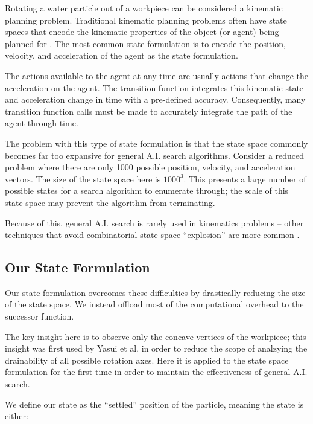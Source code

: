 Rotating a water particle out of a workpiece can be considered a kinematic planning problem. Traditional kinematic planning problems often have state spaces that encode the kinematic properties of the object (or agent) being planned for \cite{kuffner2000rrt}. The most common state formulation is to encode the position, velocity, and acceleration of the agent as the state formulation.

The actions available to the agent at any time are usually actions that change the acceleration on the agent. The transition function integrates this kinematic state and acceleration change in time with a pre-defined accuracy. Consequently, many transition function calls must be made to accurately integrate the path of the agent through time.

The problem with this type of state formulation is that the state space commonly becomes far too expansive for general A.I. search algorithms. Consider a reduced problem where there are only 1000 possible position, velocity, and acceleration vectors. The size of the state space here is $1000^3$. This presents a large number of possible states for a search algorithm to enumerate through; the scale of this state space may prevent the algorithm from terminating.

Because of this, general A.I. search is rarely used in kinematics problems -- other techniques that avoid combinatorial state space ``explosion'' are more common \cite{kuffner2000rrt} \cite{yakey2001randomized} \cite{nakamura1991nonholonomic}.

	\subsection{Our State Formulation}

Our state formulation overcomes these difficulties by drastically reducing the size of the state space. We instead offload most of the computational overhead to the successor function.

The key insight here is to observe only the concave vertices of the workpiece; this insight was first used by Yasui et al. \cite{Yasui2011} in order to reduce the scope of analzying the drainability of all possible rotation axes. Here it is applied to the state space formulation for the first time in order to maintain the effectiveness of general A.I. search.

We define our state as the ``settled'' position of the particle, meaning the state is either:

